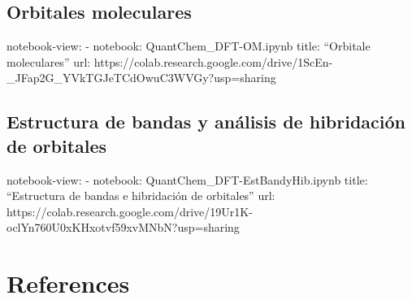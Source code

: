\documentclass[
  letterpaper,
  DIV=11,
  numbers=noendperiod]{scrreprt}
\newlength{\cslhangindent}
\newlength{\cslentryspacingunit} %
\newenvironment{CSLReferences}[2] %
 {%
  \setlength{\parindent}{0pt}
  \ifodd #1
  \let\oldpar\par
  \def\par{\hangindent=\cslhangindent\oldpar}
  \fi
  \setlength{\parskip}{#2\cslentryspacingunit}
 }%
 {}
\begin{document}
\hypertarget{orbitales-moleculares}{%
\section{Orbitales moleculares}\label{orbitales-moleculares}}

notebook-view: - notebook: QuantChem\_DFT-OM.ipynb title: ``Orbitale
moleculares'' url:
https://colab.research.google.com/drive/1ScEn-\_JFap2G\_YVkTGJeTCdOwuC3WVGy?usp=sharing

\hypertarget{estructura-de-bandas-y-anuxe1lisis-de-hibridaciuxf3n-de-orbitales}{%
\section{Estructura de bandas y análisis de hibridación de
orbitales}\label{estructura-de-bandas-y-anuxe1lisis-de-hibridaciuxf3n-de-orbitales}}

notebook-view: - notebook: QuantChem\_DFT-EstBandyHib.ipynb title:
``Estructura de bandas e hibridación de orbitales'' url:
https://colab.research.google.com/drive/19Ur1K-oclYn760U0xKHxotvf59xvMNbN?usp=sharing


\hypertarget{references}{%
\chapter*{References}\label{references}}

\hypertarget{refs}{}
\begin{CSLReferences}{0}{0}
\end{CSLReferences}
\end{document}
